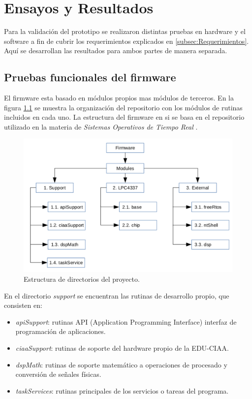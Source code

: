 \chapter{Ensayos y Resultados}
\label{Chapter4}

Para la validación del prototipo se realizaron distintas pruebas en hardware y el software a fin de cubrir los requerimientos explicados en \ref{subsec:Requerimientos}. Aquí se desarrollan las resultados para ambos partes de manera separada.

\section{ Pruebas funcionales del firmware }
\label{sec:pruebasFW}

El firmware esta basado en módulos propios mas módulos de terceros. En la figura \ref{fig:diag_Repositorio} se muestra la organización del repositorio \citep{firmwareTP} con los módulos de rutinas incluidos en cada uno. La estructura del firmware en si se basa en el repositorio utilizado en la materia de \textit{Sistemas Operativos de Tiempo Real} \citep{ws_ridolfi}.   
\begin{figure}[h!]
	\centering
	\includegraphics[width=1.0\textwidth]{Figures/Cap_4/diagrama_repositorio}
	\caption{Estructura de directorios del proyecto.}
	\label{fig:diag_Repositorio}
\end{figure}

En el directorio \textit{support} se encuentran las rutinas de desarrollo propio, que consisten en:
\begin{itemize}
\item \textit{apiSupport}: rutinas API (Application Programming Interface) interfaz de programación de aplicaciones.
\item \textit{ciaaSupport}: rutinas de soporte del hardware propio de la EDU-CIAA.
\item \textit{dspMath}: rutinas de soporte matemático a operaciones de procesado y conversión de señales físicas.
\item \textit{taskServices}: rutinas principales de los servicios o tareas del programa.
\end{itemize}

